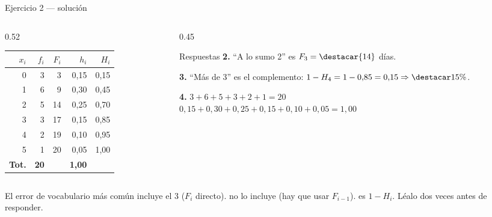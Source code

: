 \documentclass[aspectratio=169,10pt]{beamer}
\begin{document}
\begin{frame}{Ejercicio 2 — solución}
  \footnotesize
  \begin{columns}[T,onlytextwidth]
    \begin{column}{0.52\textwidth}
      \centering\scriptsize
      \begin{tabular}{@{}rrrrr@{}}
        \toprule
        \textbf{$x_i$} & \textbf{$f_i$} & \textbf{$F_i$} & \textbf{$h_i$} &
        \textbf{$H_i$} \\
        \midrule
        0 & 3 &  3 & 0{,}15 & 0{,}15 \\
        1 & 6 &  9 & 0{,}30 & 0{,}45 \\
        2 & 5 & 14 & 0{,}25 & 0{,}70 \\
        3 & 3 & 17 & 0{,}15 & 0{,}85 \\
        4 & 2 & 19 & 0{,}10 & 0{,}95 \\
        5 & 1 & 20 & 0{,}05 & 1{,}00 \\
        \midrule
        \textbf{Tot.} & \textbf{20} & & \textbf{1{,}00} & \\
        \bottomrule
      \end{tabular}
    \end{column}
    \begin{column}{0.45\textwidth}
      \begin{exampleblock}{Respuestas}
        \scriptsize
        \textbf{2.} ``A lo sumo 2'' es $F_3 = \destacar{14}$ días.

        \vspace{0.15cm}
        \textbf{3.} ``Más de 3'' es el complemento:
        $1 - H_4 = 1-0{,}85 = 0{,}15 \Rightarrow \destacar{15\%}$.

        \vspace{0.15cm}
        \textbf{4.} $3+6+5+3+2+1 = 20$ \checkmark \\
        $0{,}15+0{,}30+0{,}25+0{,}15+0{,}10+0{,}05 = 1{,}00$ \checkmark
      \end{exampleblock}
    \end{column}
  \end{columns}

  \vspace{0.15cm}
  \begin{alertblock}{El error de vocabulario más común}
    \scriptsize
     incluye el 3 ($F_i$ directo).
     no lo incluye (hay que usar $F_{i-1}$).
     es $1 - H_i$. Léalo dos veces antes de responder.
  \end{alertblock}
\end{frame}
\end{document}
